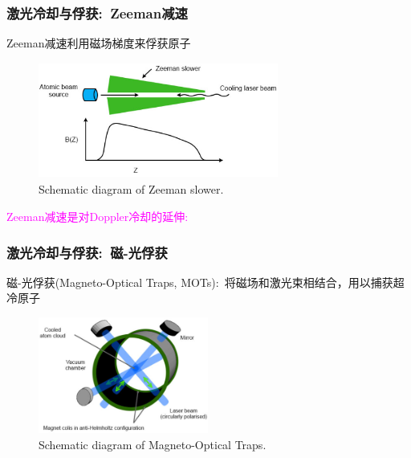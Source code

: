 \begin{frame}
	\frametitle{激光冷却与俘获:~\textrm{Zeeman}减速}
	\textrm{Zeeman}减速利用磁场梯度来俘获原子
    \begin{figure}
        \centering
                \includegraphics[height=1.5in, width=3.1in, viewport=0 0 500 237,clip]{Figures/Atom-MOT-and-laser-cooling_Zeeman_slower.png}
		\caption{\tiny{\textrm{Schematic diagram of Zeeman slower.}}}
		\label{Fig:Atom-MOT-and-laser-cooling_Zeeman_slower}
    \end{figure}
	    \vskip -10pt
	    \textcolor{magenta}{\textrm{Zeeman}减速是对\textrm{Doppler}冷却的延伸:}\\
	{\fontsize{8.5pt}{5.2pt}}
\end{frame}

\begin{frame}
	\frametitle{激光冷却与俘获:~磁-光俘获}
	磁-光俘获\textrm{(Magneto-Optical Traps, MOTs)}:~将磁场和激光束相结合，用以捕获超冷原子
    \begin{figure}
        \centering
                \includegraphics[height=1.5in, width=2.2in, viewport=0 0 500 341,clip]{Figures/Atom-MOT-and-laser-cooling_MOTs.png}
		\caption{\tiny{\textrm{Schematic diagram of Magneto-Optical Traps.}}}
		\label{Fig:Atom-MOT-and-laser-cooling_MOTs}
    \end{figure}
	    \vskip -10pt
    {\fontsize{7.5pt}{5.2pt}\selectfont{由多束对向激光束构成稳定的区域，并利用磁场将原子约束在该区域:\\
    原子在该区域内运动时，将感受到指向激光束束心的回复力。由此将形成冷原子凝聚云，并可以长期保持}}
\end{frame}

